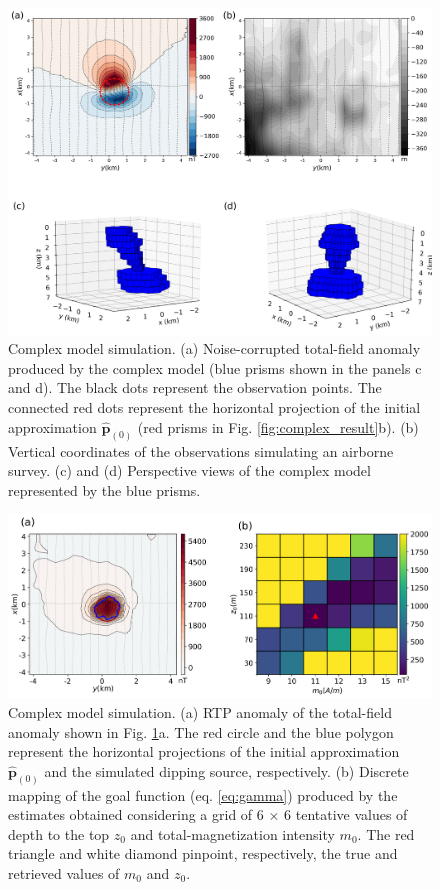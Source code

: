 \begin{figure}
    \centering
    \includegraphics[width=\linewidth]{figures/complex_model_data.png}
    \caption{Complex model simulation. (a) Noise-corrupted total-field anomaly produced by the complex model (blue prisms shown in the panels c and d). The black dots represent the observation points. The connected red dots represent the horizontal projection 
   	of the initial approximation $\hat{\mathbf{p}}_{(0)}$ 
   	(red prisms in Fig. \ref{fig:complex_result}b). (b) Vertical coordinates of the observations simulating an airborne survey. (c) and (d) Perspective views of the complex model represented by the blue prisms.
}
    \label{fig:complex_model}
\end{figure}

\begin{figure}
    \centering
    \includegraphics[width=\linewidth]{figures/complex_rtp.png}
    \caption{Complex model simulation. (a) RTP anomaly of the total-field anomaly shown in 
	Fig. \ref{fig:complex_model}a. 
	The red circle and the blue polygon represent the horizontal projections of the 	   initial approximation $\hat{\mathbf{p}}_{(0)}$ and  the simulated dipping source, respectively.
	(b) Discrete mapping of the goal function (eq. \ref{eq:gamma}) produced by the estimates   	       obtained considering a grid of 6 $\times$ 6 tentative values of 
	   depth to the top $z_0$ and total-magnetization intensity $m_0$. 
	   The red triangle  and white diamond pinpoint, respectively, the true and retrieved 	   
	   values of $m_0$  and $z_0$.     
}
    \label{fig:complex_rtp}
\end{figure}

